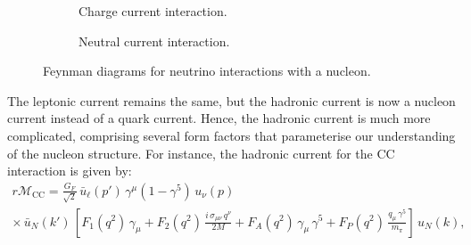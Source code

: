 \begin{figure}[h]
  \centering
  \begin{subfigure}[b]{0.45\textwidth}
    \centering
    \caption{Charge current interaction.}
    \label{fig:cc-interaction-n}
  \end{subfigure}
  \hfill
  \begin{subfigure}[b]{0.45\textwidth}
    \centering
    \caption{Neutral current interaction.}
    \label{fig:nc-interaction-n}
  \end{subfigure}
  \caption{Feynman diagrams for neutrino interactions with a nucleon.}
  \label{fig:nu-n-feyn}
\end{figure}
The leptonic current remains the same, but the hadronic current is now a nucleon current instead of a quark current.
Hence, the hadronic current is much more complicated, comprising several form factors that parameterise our understanding of the nucleon structure.
For instance, the hadronic current for the CC interaction is given by:
\begin{eqnarray}{r}
  \mathcal{M}_{\text{CC}} = \frac{G_F}{\sqrt{2}} \,\bar{u}_\ell(p')\,\gamma^\mu (1 - \gamma^5)\,u_\nu(p) \\
  \times \,\bar{u}_N(k')\,\left[ F_1(q^2)\,\gamma_\mu + F_2(q^2)\,\frac{i\,\sigma_{\mu\nu}\,q^\nu}{2M} + F_A(q^2)\,\gamma_\mu\,\gamma^5 + F_P(q^2)\,\frac{q_\mu\,\gamma^5}{m_\pi} \right]\,u_N(k),
\end{eqnarray}
